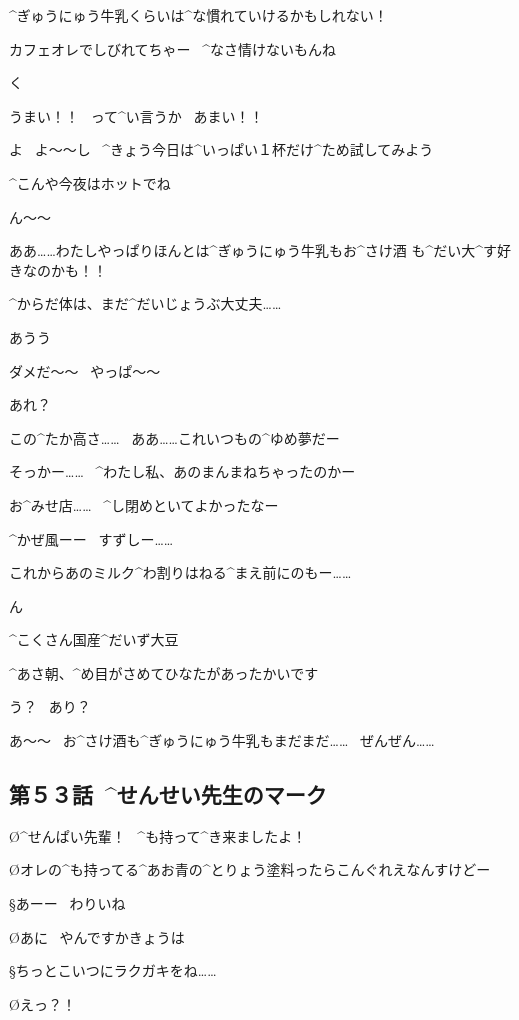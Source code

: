 \A ^{ぎゅうにゅう}{牛乳}くらいは^{な}{慣}れていけるかもしれない！

\A カフェオレでしびれてちゃー
\ ^{なさ}{情}けないもんね

\page
\A く

\A うまい！！
\ って^{い}{言}うか
\ あまい！！

\A よ
\ よ〜〜し
\ ^{きょう}{今日}は^{いっぱい}{１杯}だけ^{ため}{試}してみよう

\page
\A ^{こんや}{今夜}はホットでね

\page
\A ん〜〜

\A ああ……わたしやっぱりほんとは^{ぎゅうにゅう}{牛乳}もお^{さけ}{酒}
も^{だい}{大}^{す}{好}きなのかも！！

\page
\A ^{からだ}{体}は、まだ^{だいじょうぶ}{大丈夫}……

\page
\A あうう

\A ダメだ〜〜
\ やっぱ〜〜

\page
\A あれ？

\page
\A この^{たか}{高}さ……
\ ああ……これいつもの^{ゆめ}{夢}だー

\A そっかー……
\ ^{わたし}{私}、あのまんまねちゃったのかー

\A お^{みせ}{店}……
\ ^{し}{閉}めといてよかったなー

\A ^{かぜ}{風}ーー
\ すずしー……

\A これからあのミルク^{わ}{割}りはねる^{まえ}{前}にのもー……

\page
\A ん

\Sign ^{こくさん}{国産}^{だいず}{大豆}

\A ^{あさ}{朝}、^{め}{目}がさめてひなたがあったかいです

\A う？
\ あり？

\A あ〜〜
\ お^{さけ}{酒}も^{ぎゅうにゅう}{牛乳}もまだまだ……
\ ぜんぜん……


\subsection{第５３話\ ^{せんせい}{先生}のマーク}

\page[140]
\O ^{せんぱい}{先輩}！
\ ^{も}{持}って^{き}{来}ましたよ！

\O オレの^{も}{持}ってる^{あお}{青}の^{とりょう}{塗料}ったらこんぐれえなんすけどー

\page
\S あーー
\ わりいね

\O あに
\ やんですかきょうは

\S ちっとこいつにラクガキをね……

\O えっ？！

